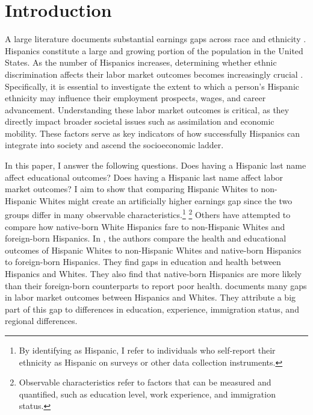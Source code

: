 
\section{Introduction}

A large literature documents substantial earnings gaps across race and ethnicity \autocite{bayer2018divergent, charles2008prejudice}. Hispanics constitute a large and growing portion of the population in the United States. As the number of Hispanics increases, determining whether ethnic discrimination affects their labor market outcomes becomes increasingly crucial \autocite{chettyUnitedStatesStill2014, chettyEffectsExposureBetter2016,chettyFadingAmericanDream2017}. Specifically, it is essential to investigate the extent to which a person's Hispanic ethnicity may influence their employment prospects, wages, and career advancement. Understanding these labor market outcomes is critical, as they directly impact broader societal issues such as assimilation and economic mobility. These factors serve as key indicators of how successfully Hispanics can integrate into society and ascend the socioeconomic ladder.

In this paper, I answer the following questions. Does having a Hispanic last name affect educational outcomes? Does having a Hispanic last name affect labor market outcomes? I aim to show that comparing Hispanic Whites to non-Hispanic Whites might create an artificially higher earnings gap since the two groups differ in many observable characteristics.\footnote{By identifying as Hispanic, I refer to individuals who self-report their ethnicity as Hispanic on surveys or other data collection instruments.} \footnote{Observable characteristics refer to factors that can be measured and quantified, such as education level, work experience, and immigration status.} Others have attempted to compare how native-born White Hispanics fare to non-Hispanic Whites and foreign-born Hispanics. In \textcite{antman2020ethnic,antmanEthnicAttritionObserved2016,antmanEthnicAttritionObserved2016a,antmanEthnicAttritionAssimilation2020}, the authors compare the health and educational outcomes of Hispanic Whites to non-Hispanic Whites and native-born Hispanics to foreign-born Hispanics. They find gaps in education and health between Hispanics and Whites. They also find that native-born Hispanics are more likely than their foreign-born counterparts to report poor health. \textcite{davilaChangesRelativeEarnings2008} documents many gaps in labor market outcomes between Hispanics and Whites. They attribute a big part of this gap to differences in education, experience, immigration status, and regional differences. 

